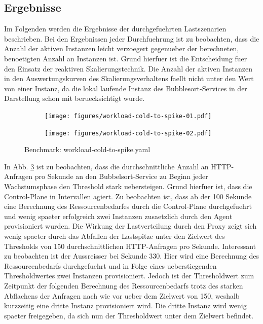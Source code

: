 \documentclass[runningheads]{llncs}
\begin{document}
\subsection{Ergebnisse}

Im Folgenden werden die Ergebnisse der durchgefuehrten Lastszenarien beschrieben. Bei den Ergebnissen jeder Durchfuehrung ist zu beobachten, dass die Anzahl der aktiven Instanzen leicht verzoegert gegenueber der berechneten, benoetigten Anzahl an Instanzen ist. Grund hierfuer ist die Entscheidung fuer den Einsatz der reaktiven Skalierungstechnik. Die Anzahl der aktiven Instanzen in den Auswertungskurven des Skalierungsverhaltens faellt nicht unter den Wert von einer Instanz, da die lokal laufende Instanz des Bubblesort-Services in der Darstellung schon mit beruecksichtigt wurde. \\

\begin{figure}
	\centering
	\begin{subfigure}{.5\textwidth}
		\centering
		\texttt{[image: figures/workload-cold-to-spike-01.pdf]}
		\label{fig:sub11}
	\end{subfigure}%
	\begin{subfigure}{.5\textwidth}
		\centering
		\texttt{[image: figures/workload-cold-to-spike-02.pdf]}
		\label{fig:sub2}
	\end{subfigure}
	\caption{Benchmark: workload-cold-to-spike.yaml}
	\label{fig:benchmark_01}
\end{figure}

In Abb. \ref{fig:benchmark_01} ist zu beobachten, dass die durchschnittliche Anzahl an HTTP-Anfragen pro Sekunde an den Bubbelsort-Service zu Beginn jeder Wachstumsphase den Threshold stark uebersteigen. Grund hierfuer ist, dass die Control-Plane in Intervallen agiert. Zu beobachten ist, dass ab der 100 Sekunde eine Berechnung des Ressourcenbedarfes durch die Control-Plane durchgefuehrt und wenig  spaeter erfolgreich zwei Instanzen zusaetzlich durch den Agent provisioniert wurden. Die Wirkung der Lastverteilung durch den Proxy zeigt sich wenig spaeter durch das Abfallen der Lastspitze unter den Zielwert des Thresholds von 150 durchschnittlichen  HTTP-Anfragen pro Sekunde. Interessant zu beobachten ist der Aussreisser bei Sekunde 330. Hier wird eine Berechnung des Ressourcenbedarfs durchgefuehrt und in Folge eines ueberstiegenden Thresholdwertes zwei Instanzen provisioniert. Jedoch ist der Thresholdwert zum Zeitpunkt der folgenden Berechnung des Ressourcenbedarfs trotz des starken Abflachens der Anfragen nach wie vor ueber dem Zielwert von 150, weshalb kurzzeitig eine dritte Instanz provisioniert wird. Die dritte Instanz wird wenig spaeter freigegeben, da sich nun der Thresholdwert unter dem Zielwert befindet. \\
	
\end{document}
